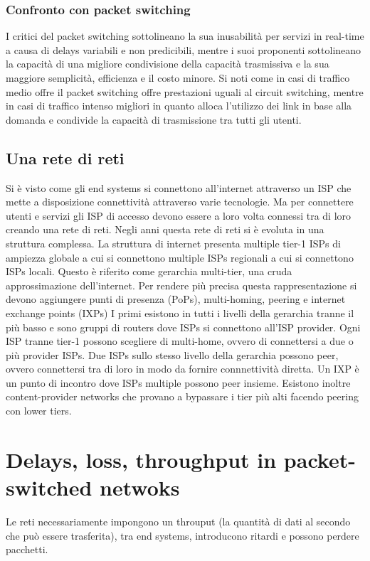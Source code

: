 \subsubsection{Confronto con packet switching}
I critici del packet switching sottolineano la sua inusabilit\`a per servizi in real-time a causa di delays variabili e non predicibili, mentre i suoi proponenti sottolineano la capacit\`a di una migliore condivisione 
della capacit\`a trasmissiva e la sua maggiore semplicit\`a, efficienza e il costo minore. Si noti come in casi di traffico medio offre il packet switching offre prestazioni uguali al circuit switching, mentre in casi
di traffico intenso migliori in quanto alloca l'utilizzo dei link in base alla domanda e condivide la capacit\`a di trasmissione tra tutti gli utenti. 
\subsection{Una rete di reti}
Si \`e visto come gli end systems si connettono all'internet attraverso un ISP che mette a disposizione connettivit\`a attraverso varie tecnologie. Ma per connettere utenti e servizi gli ISP di accesso devono essere
a loro volta connessi tra di loro creando una rete di reti. Negli anni questa rete di reti si \`e evoluta in una struttura complessa. La struttura di internet presenta multiple tier-1 ISPs di ampiezza globale a cui si 
connettono multiple ISPs regionali a cui si connettono ISPs locali. Questo \`e riferito come gerarchia multi-tier, una cruda approssimazione dell'internet. Per rendere pi\`u precisa questa rappresentazione 
si devono aggiungere punti di presenza (PoPs), multi-homing, peering e internet exchange points (IXPs) I primi esistono in tutti i livelli della gerarchia tranne il pi\`u basso e sono gruppi di routers dove ISPs
si connettono all'ISP provider. Ogni ISP tranne tier-1 possono scegliere di multi-home, ovvero di connettersi a due o pi\`u provider ISPs. Due ISPs sullo stesso livello della gerarchia possono peer, ovvero 
connettersi tra di loro in modo da fornire connnettivit\`a diretta. Un IXP \`e un punto di incontro dove ISPs multiple possono peer insieme. Esistono inoltre content-provider networks che provano a bypassare
i tier pi\`u alti facendo peering con lower tiers. 
\section{Delays, loss, throughput in packet-switched netwoks}
Le reti necessariamente impongono un throuput (la quantit\`a di dati al secondo che pu\`o essere trasferita), tra end systems, introducono ritardi e possono perdere pacchetti.
